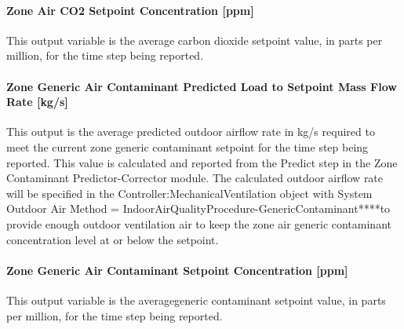 \paragraph{Zone Air CO2 Setpoint Concentration {[}ppm{]}}\label{zone-air-co2-setpoint-concentration-ppm}

This output variable is the average carbon dioxide setpoint value, in parts per million, for the time step being reported.

\paragraph{Zone Generic Air Contaminant Predicted Load to Setpoint Mass Flow Rate {[}kg/s{]}}\label{zone-generic-air-contaminant-predicted-load-to-setpoint-mass-flow-rate-kgs}

This output is the average predicted outdoor airflow rate in kg/s required to meet the current zone generic contaminant setpoint for the time step being reported. This value is calculated and reported from the Predict step in the Zone Contaminant Predictor-Corrector module. The calculated outdoor airflow rate will be specified in the Controller:MechanicalVentilation object with System Outdoor Air Method = IndoorAirQualityProcedure-GenericContaminant****to provide enough outdoor ventilation air to keep the zone air generic contaminant concentration level at or below the setpoint.

\paragraph{Zone Generic Air Contaminant Setpoint Concentration {[}ppm{]}}\label{zone-generic-air-contaminant-setpoint-concentration-ppm}

This output variable is the averagegeneric contaminant setpoint value, in parts per million, for the time step being reported.